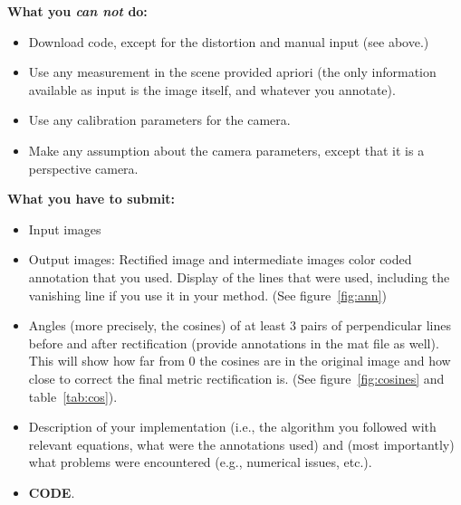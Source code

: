 \documentclass[11pt]{article}
\begin{document}
{\bf What you {\it can not} do:}\vspace{-0.25in}\\
\begin{itemize}
\item Download code, except for the distortion and manual input (see above.)
\item Use any measurement in the scene provided apriori (the only information available as input is the image itself, and whatever you annotate).
\item Use any calibration parameters for the camera.
\item Make any assumption about the camera parameters, except that it is a perspective camera.
\end{itemize}


{\bf What you have to submit:}\vspace{-0.05in}
\begin{itemize}
\item Input images
\item Output images: Rectified image and intermediate images color coded annotation that you used. Display of the lines that were used, including the vanishing line if you use it in your method. (See figure~\ref{fig:ann})
\item Angles (more precisely, the cosines) of at least 3 pairs of perpendicular lines before and after rectification (provide annotations in the mat file as well). This will show how far from 0 the cosines are in the original image and how close to correct the final metric rectification is. (See figure~\ref{fig:cosines} and table~\ref{tab:cos}).
\item Description of your implementation (i.e., the algorithm you followed with relevant equations, what were the annotations used) and (most importantly) what problems were encountered (e.g., numerical issues, etc.).
\item {\bf CODE}.
\end{itemize}
\end{document}

